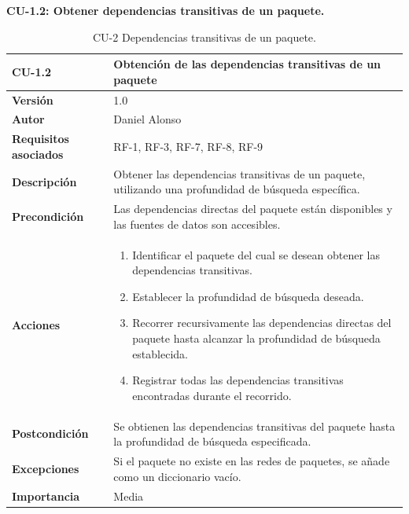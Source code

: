 \textbf{CU-1.2: Obtener dependencias transitivas de un paquete.}

\begin{table}[p]
	\centering
	\begin{tabularx}{\linewidth}{ p{} p{} }
		\toprule
		\textbf{CU-1.2}               & \textbf{Obtención de las dependencias transitivas de un paquete}                                       \\
		\toprule
		\textbf{Versión}              & 1.0                                                                                                    \\
		\textbf{Autor}                & Daniel Alonso                                                                                          \\
		\textbf{Requisitos asociados} & RF-1, RF-3, RF-7, RF-8, RF-9                                                                           \\
		\textbf{Descripción}          & Obtener las dependencias transitivas de un paquete, utilizando una profundidad de búsqueda específica. \\
		\textbf{Precondición}         & Las dependencias directas del paquete están disponibles y las fuentes de datos son accesibles.         \\
		\textbf{Acciones}             &
		\begin{enumerate}
			\def\labelenumi{\arabic{enumi}.}
			\tightlist
			\item Identificar el paquete del cual se desean obtener las dependencias transitivas.
			\item Establecer la profundidad de búsqueda deseada.
			\item Recorrer recursivamente las dependencias directas del paquete hasta alcanzar la profundidad de búsqueda establecida.
			\item Registrar todas las dependencias transitivas encontradas durante el recorrido.
		\end{enumerate}              \\
		\textbf{Postcondición}        & Se obtienen las dependencias transitivas del paquete hasta la profundidad de búsqueda especificada.    \\
		\textbf{Excepciones}          & Si el paquete no existe en las redes de paquetes, se añade como un diccionario vacío.                  \\
		\textbf{Importancia}          & Media                                                                                                  \\
		\bottomrule
	\end{tabularx}
	\caption{CU-2 Dependencias transitivas de un paquete.}
	\label{tab:cu2}
\end{table}

